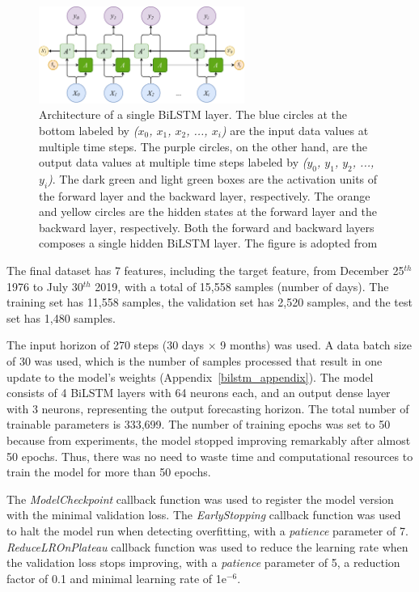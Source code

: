 \begin{figure}[htp]
	\centering
    \includegraphics[width=0.6\textwidth]{chapter4/figs/diagram.drawio.pdf}
    \caption{Architecture of a single BiLSTM layer. The blue circles at the bottom labeled by \textit{($x_0$, $x_1$, $x_2$, ..., $x_i$)} are the input data values at multiple time steps. The purple circles, on the other hand, are the output data values at multiple time steps labeled by \textit{($y_0$, $y_1$, $y_2$, ..., $y_i$)}. The dark green and light green boxes are the activation units of the forward layer and the backward layer, respectively. The orange and yellow circles are the hidden states at the forward layer and the backward layer, respectively. Both the forward and backward layers composes a single hidden BiLSTM layer. The figure is adopted from \citet{olah_2015}}
\label{fig_model}
\end{figure}

The final dataset has 7 features, including the target feature, from December 25$^{th}$ 1976 to July 30$^{th}$ 2019, with a total of 15,558 samples (number of days). The training set has 11,558 samples, the validation set has 2,520 samples, and the test set has 1,480 samples.

The input horizon of 270 steps (30 days $\times$ 9 months) was used.
A data batch size of 30 was used, which is the number of samples processed that result in one update to the model's weights (Appendix~\ref{bilstm_appendix}).
The model consists of 4 BiLSTM layers with 64 neurons each, and an output dense layer with 3 neurons, representing the output forecasting horizon.
The total number of trainable parameters is 333,699.
The number of training epochs was set to 50 because from experiments, the model stopped improving remarkably after almost 50 epochs. Thus, there was no need to waste time and computational resources to train the model for more than 50 epochs.

The \textit{ModelCheckpoint} callback function was used to register the model version with the minimal validation loss. 
The \textit{EarlyStopping} callback function was used to halt the model run when detecting overfitting, with a \textit{patience} parameter of 7. 
\textit{ReduceLROnPlateau} callback function was used to reduce the learning rate when the validation loss stops improving, with a \textit{patience} parameter of 5, a reduction factor of 0.1 and minimal learning rate of 1e$^{-6}$.
